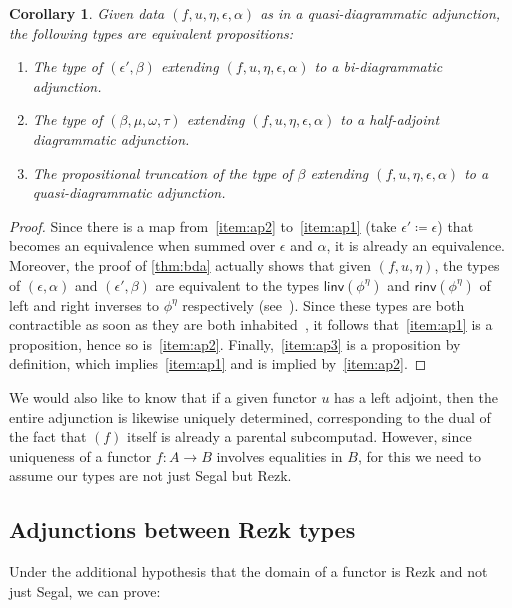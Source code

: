 \documentclass[12pt]{amsart}
\theoremstyle{plain}
\newtheorem{cor}[thm]{Corollary}
\theoremstyle{definition}
\theoremstyle{remark}
\numberwithin{equation}{section}
\newcommand{\defeq}{\coloneqq}
\begin{document}
\begin{cor}\label{thm:alpha-parental}
  Given data $(f,u,\eta,\epsilon,\alpha)$ as in a quasi-diagrammatic adjunction, the following types are equivalent propositions:
  \begin{enumerate}[label=(\roman*)]
  \item The type of $(\epsilon',\beta)$ extending $(f,u,\eta,\epsilon,\alpha)$ to a bi-diagrammatic adjunction.\label{item:ap1}
  \item The type of $(\beta,\mu,\omega,\tau)$ extending $(f,u,\eta,\epsilon,\alpha)$ to a half-adjoint diagrammatic adjunction.\label{item:ap2}
  \item The propositional truncation of the type of $\beta$ extending $(f,u,\eta,\epsilon,\alpha)$ to a quasi-diagrammatic adjunction.\label{item:ap3}
  \end{enumerate}
\end{cor}
\begin{proof}
  Since there is a map from~\ref{item:ap2} to~\ref{item:ap1} (take $\epsilon'\defeq\epsilon$) that becomes an equivalence when summed over $\epsilon$ and $\alpha$, it is already an equivalence.
  Moreover, the proof of \cref{thm:bda} actually shows that given $(f,u,\eta)$, the types of $(\epsilon,\alpha)$ and $(\epsilon',\beta)$ are equivalent to the types $\mathsf{linv}(\phi^\eta)$ and $\mathsf{rinv}(\phi^\eta)$ of left and right inverses to $\phi^\eta$ respectively (see~\cite[Definition 4.2.7]{hottbook}).
  Since these types are both contractible as soon as they are both inhabited~\cite[Lemma 4.2.9]{hottbook}, it follows that~\ref{item:ap1} is a proposition, hence so is~\ref{item:ap2}.
  Finally,~\ref{item:ap3} is a proposition by definition, which implies~\ref{item:ap1} and is implied by~\ref{item:ap2}.
\end{proof}

We would also like to know that if a given functor $u$ has a left adjoint, then the entire adjunction is likewise uniquely determined, corresponding to the dual of the fact that $(f)$ itself is already a parental subcomputad.
However, since uniqueness of a functor $f:A\to B$ involves equalities in $B$, for this we need to assume our types are not just Segal but Rezk.


\subsection{Adjunctions between Rezk types}
\label{sec:adj-rezk}

Under the additional hypothesis that the domain of a functor is Rezk and not just Segal, we can prove:
\end{document}
